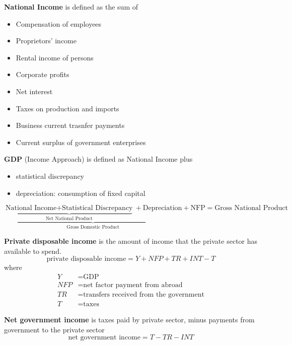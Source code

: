 \begin{definition}
    \textbf{National Income} is defined as the sum of 
    \begin{itemize}
        \item Compensation of employees
        \item Proprietors' income 
        \item Rental income of persons
        \item Corporate profits
        \item Net interest
        \item Taxes on production and imports
        \item Business current trasnfer payments
        \item Current surplus of government enterprises
    \end{itemize} 

    \textbf{GDP} (Income Approach) is defined as National Income plus
    \begin{itemize}
        \item statistical discrepancy
        \item depreciation: consumption of fixed capital
    \end{itemize} 
\end{definition}

\begin{remarks}
\[
\underbrace{
\underbrace{
    \text{National Income}
    + \text{Statistical Discrepancy}
}_{\text{Net National Product}}
+ \text{Depreciation}
}_{\text{Gross Domestic Product}}
+ \text{NFP}
= \text{Gross National Product}
\]
\end{remarks}

\begin{definition}
    \textbf{Private disposable income} is the amount of income that the private sector has available to spend.
    \[
        \text{private disposable income} = Y + NFP + TR + INT - T
    \]
    where 
    \begin{align*}
        Y &= \text{GDP} \\
        NFP &= \text{net factor payment from abroad} \\
        TR &= \text{transfers received from the government} \\
        T &= \text{taxes}
    \end{align*}
\end{definition}

\begin{definition}
    \textbf{Net government income} is taxes paid by private sector, minus payments from government to the private sector 
    \[
        \text{net government income} = T - TR - INT
    \]
\end{definition}

